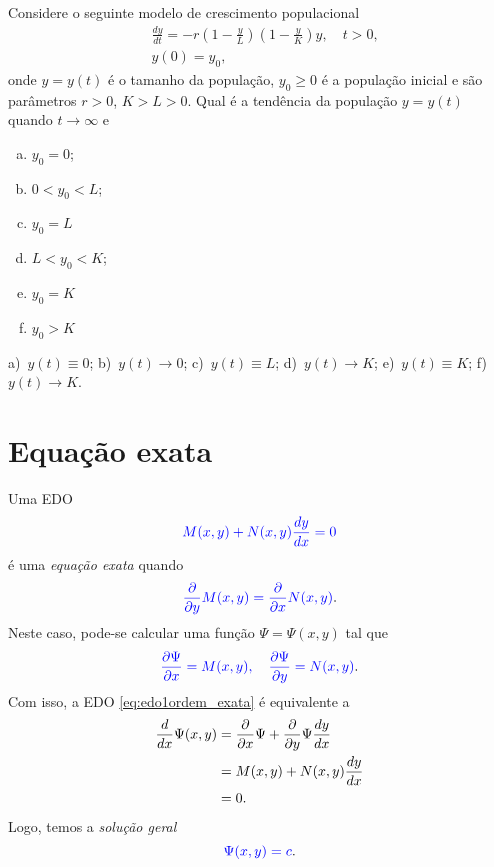 \begin{exer}
  Considere o seguinte modelo de crescimento populacional
  \begin{align*}
    &\frac{dy}{dt} = -r\left(1 - \frac{y}{L}\right)\left(1 - \frac{y}{K}\right)y,\quad t>0,\\
    &y(0) = y_0,
  \end{align*}
  onde $y = y(t)$ é o tamanho da população, $y_0 \geq 0$ é a população inicial e são parâmetros $r > 0$, $K>L>0$. Qual é a tendência da população $y = y(t)$ quando $t\to\infty$ e
  \begin{enumerate}[a)]
  \item $y_0 = 0$;
  \item $0 < y_0 < L$;
  \item $y_0 = L$
  \item $L < y_0 < K$;
  \item $y_0 = K$
  \item $y_0 > K$
  \end{enumerate}
\end{exer}
\begin{resp}
  a)~$y(t) \equiv 0$; b)~$y(t)\to 0$; c)~$y(t)\equiv L$; d)~$y(t)\to K$; e)~$y(t)\equiv K$; f)~$y(t)\to K$.
\end{resp}

\section{Equação exata}\label{cap_edo1ordem_sec_eqexata}

Uma EDO
\begin{equation}\label{eq:edo1ordem_exata}
  {\color{blue} M(x,y) + N(x,y)\frac{dy}{dx} = 0}
\end{equation}
é uma \emph{equação exata} quando
\begin{equation}
  {\color{blue} \frac{\partial}{\partial y}M(x,y) = \frac{\partial}{\partial x}N(x,y)}.
\end{equation}
Neste caso, pode-se calcular uma função $\Psi = \Psi(x,y)$ tal que
\begin{equation}
  {\color{blue}\frac{\partial\Psi}{\partial x} = M(x,y),\quad\frac{\partial\Psi}{\partial y} = N(x,y)}.
\end{equation}
Com isso, a EDO \eqref{eq:edo1ordem_exata} é equivalente a
\begin{align}
  \frac{d}{dx}\Psi(x,y) &= \frac{\partial}{\partial x}\Psi + \frac{\partial}{\partial y}\Psi\frac{dy}{dx} \\
                        &= M(x,y) + N(x,y)\frac{dy}{dx} \\
                        &= 0.
\end{align}
Logo, temos a \emph{solução geral}
\begin{equation}
  {\color{blue}\Psi(x,y) = c}.
\end{equation}

